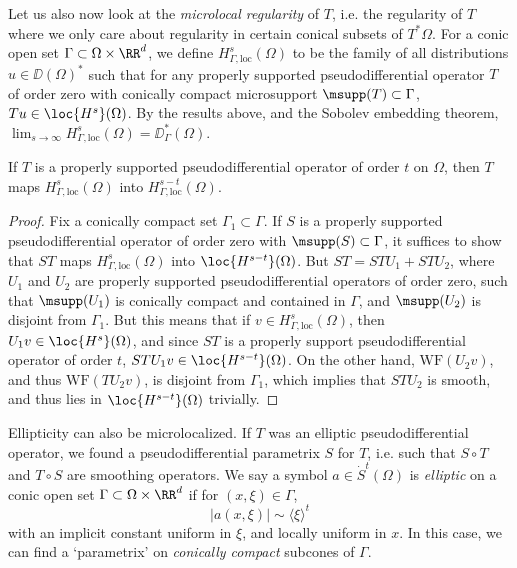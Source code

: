 Let us also now look at the \emph{microlocal regularity} of $T$, i.e. the regularity of $T$ where we only care about regularity in certain conical subsets of $T^* \Omega$. For a conic open set $\Gamma \subset \Omega \times \RR^d$, we define $H^s_{\Gamma,\text{loc}}(\Omega)$ to be the family of all distributions $u \in \DD(\Omega)^*$ such that for any properly supported pseudodifferential operator $T$ of order zero with conically compact microsupport $\msupp(T) \subset \Gamma$, $Tu \in \loc{H^s}(\Omega)$. By the results above, and the Sobolev embedding theorem, $\lim_{s \to \infty} H^s_{\Gamma,\text{loc}} (\Omega) = \DD^*_\Gamma(\Omega)$.

\begin{theorem}
    If $T$ is a properly supported pseudodifferential operator of order $t$ on $\Omega$, then $T$ maps $H^s_{\Gamma,\text{loc}}(\Omega)$ into $H^{s-t}_{\Gamma,\text{loc}}(\Omega)$.
\end{theorem}
\begin{proof}
    Fix a conically compact set $\Gamma_1 \subset \Gamma$. If $S$ is a properly supported pseudodifferential operator of order zero with $\msupp(S) \subset \Gamma$, it suffices to show that $ST$ maps $H^s_{\Gamma,\text{loc}}(\Omega)$ into $\loc{H^{s-t}}(\Omega)$. But $ST = STU_1 + STU_2$, where $U_1$ and $U_2$ are properly supported pseudodifferential operators of order zero, such that $\msupp(U_1)$ is conically compact and contained in $\Gamma$, and $\msupp(U_2)$ is disjoint from $\Gamma_1$. But this means that if $v \in H^s_{\Gamma,\text{loc}}(\Omega)$, then $U_1 v \in \loc{H^s}(\Omega)$, and since $ST$ is a properly support pseudodifferential operator of order $t$, $STU_1 v \in \loc{H^{s-t}}(\Omega)$. On the other hand, $\text{WF}(U_2 v)$, and thus $\text{WF}(TU_2 v)$, is disjoint from $\Gamma_1$, which implies that $STU_2$ is smooth, and thus lies in $\loc{H^{s-t}}(\Omega)$ trivially.
\end{proof}

Ellipticity can also be microlocalized. If $T$ was an elliptic pseudodifferential operator, we found a pseudodifferential parametrix $S$ for $T$, i.e. such that $S \circ T$ and $T \circ S$ are smoothing operators. We say a symbol $a \in \dot{S}^t(\Omega)$ is \emph{elliptic} on a conic open set $\Gamma \subset \Omega \times \RR^d$ if for $(x,\xi) \in \Gamma$,
%
\[ |a(x,\xi)| \sim \langle \xi \rangle^t \]
%
with an implicit constant uniform in $\xi$, and locally uniform in $x$. In this case, we can find a `parametrix' on \emph{conically compact} subcones of $\Gamma$.

